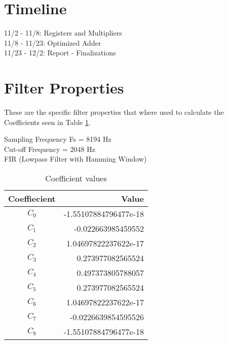 \documentclass[12pt]{article}
\begin{document}
\section{Timeline}

11/2 - 11/8: Registers and Multipliers \\
11/8 - 11/23: Optimized Adder \\
11/23 - 12/2: Report - Finalizations \\

\section{Filter Properties}
These are the specific filter properties that where used to calculate the Coefficients seen in Table \ref{tab:coefficients}.

Sampling Frequency Fs = 8194 Hz \\
Cut-off Frequency = 2048 Hz \\
FIR (Lowpass Filter with Hamming Window) \\

\begin{table}[ht]
\centering
\begin{tabular}{ c | r }
\hline
Coeffiecient & Value \\
\hline \hline
$C_0$ & -1.55107884796477e-18 \\
$C_1$ & -0.022663985459552 \\
$C_2$ & 1.04697822237622e-17 \\
$C_3$ & 0.273977082565524 \\
$C_4$ & 0.497373805788057 \\
$C_5$ & 0.273977082565524 \\
$C_6$ & 1.04697822237622e-17 \\
$C_7$ & -0.0226639854595526 \\
$C_8$ & -1.55107884796477e-18 \\
\end{tabular}
\caption{Coefficient values}
\label{tab:coefficients}
\end{table}




\end{document}
